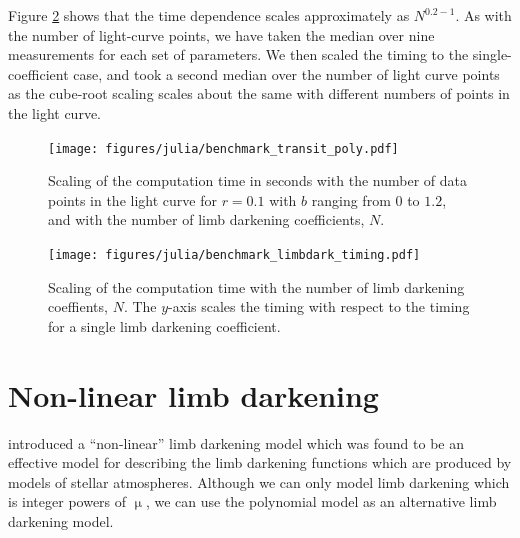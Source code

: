 \documentclass[modern]{aastex61}
\begin{document}
Figure \ref{fig:nlimb} shows that the time dependence scales approximately
as $N^{0.2-1}$.  As with the number of light-curve points, we have taken
the median over nine measurements for each set of parameters.  We then
scaled the timing to the single-coefficient case, and took a second
median over the number of light curve points as the cube-root scaling scales
about the same with different numbers of points in the light curve.

\begin{figure}
    \begin{centering}
    \texttt{[image: figures/julia/benchmark\_transit\_poly.pdf]}
    \caption{Scaling of the computation time in seconds with the number of
    data points in the light curve for $r=0.1$ with $b$ ranging from $0$ to $1.2$,
    and with the number of limb darkening coefficients, $N$. 
    \label{fig:ncoeff}}
    \end{centering}
\end{figure}

\begin{figure}
    \begin{centering}
    \texttt{[image: figures/julia/benchmark\_limbdark\_timing.pdf]}
    \caption{Scaling of the computation time with the number of
    limb darkening coeffients, $N$.  The $y$-axis scales the timing with respect
    to the timing for a single limb darkening coefficient. 
    \label{fig:nlimb}}
    \end{centering}
\end{figure}

\section{Non-linear limb darkening}\label{sec:nonlinear}

\citet{Claret2000} introduced a ``non-linear'' limb darkening model which
was found to be an effective model for describing the limb darkening functions
which are produced by models of stellar atmospheres.
Although we can only model limb darkening which is integer powers of $\upmu$,
we can use the polynomial model as an alternative limb darkening model.

\end{document}
